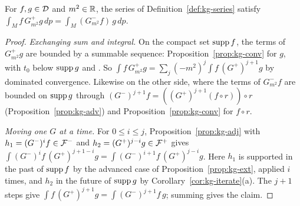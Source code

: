 \begin{proposition}\label{prop:kg-series-adj}
For $f,g\in\mathcal D$ and $m^2\in\mathbb R$, the series of Definition~\ref{def:kg-series} satisfy
$\int_Mf\,G^+_{m^2}g\,dp=\int_M(G^-_{m^2}f)\,g\,dp$.
\end{proposition}
\begin{proof}
\emph{Exchanging sum and integral.} On the compact set $\operatorname{supp} f$, the terms of $G^+_{m^2}g$ are
bounded by a summable sequence: Proposition~\ref{prop:kg-conv} for $g$, with $t_0$ below $\operatorname{supp} g$ and
. So $\int f\,G^+_{m^2}g=\sum_j(-m^2)^j\int f\,(G^+)^{j+1}g$ by dominated
convergence. Likewise on the other side, where the terms of $G^-_{m^2}f$ are bounded on $\operatorname{supp} g$
through $(G^-)^{j+1}f=((G^+)^{j+1}(f\circ r))\circ r$ (Proposition~\ref{prop:kg-adv}) and
Proposition~\ref{prop:kg-conv} for $f\circ r$.

\emph{Moving one $G$ at a time.} For $0\le i\le j$, Proposition~\ref{prop:kg-adj} with
$h_1=(G^-)^if\in\mathcal F^-$ and $h_2=(G^+)^{j-i}g\in\mathcal F^+$ gives
$\int(G^-)^if\,(G^+)^{j+1-i}g=\int(G^-)^{i+1}f\,(G^+)^{j-i}g$. Here $h_1$ is supported in the past of
$\operatorname{supp} f$ by the advanced case of Proposition~\ref{prop:kg-ext}, applied $i$ times, and $h_2$ in the
future of $\operatorname{supp} g$ by Corollary~\ref{cor:kg-iterate}(a). The $j+1$ steps give
$\int f\,(G^+)^{j+1}g=\int(G^-)^{j+1}f\,g$; summing gives the claim.
\end{proof}

\subsection{}

